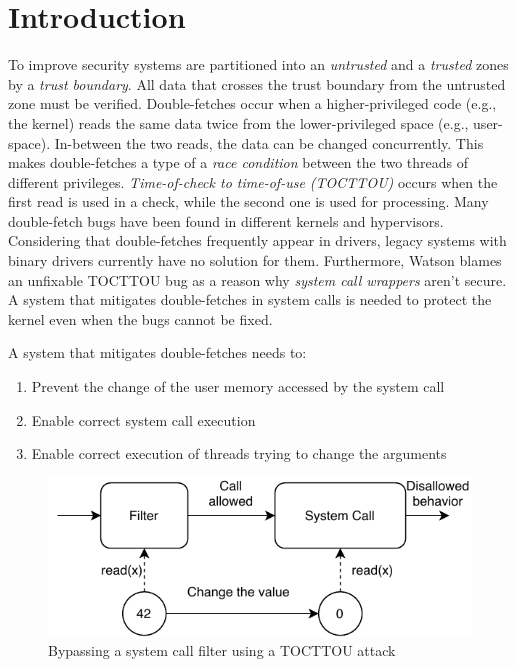 \section{Introduction}


To improve security systems are partitioned into an \emph{untrusted} and a
\emph{trusted} zones by a \emph{trust boundary}. All data that crosses the trust
boundary from the untrusted zone must be verified.
Double-fetches\cite{serna08doublefetch, twizsgrakky07ring0, wilhelm2016xenpwn,
wang2018survey} occur when a higher-privileged code (e.g., the kernel) reads the
same data twice from the lower-privileged space (e.g., user-space). In-between
the two reads, the data can be changed concurrently. This makes double-fetches a
type of a \emph{race condition} between the two threads of different privileges.
\emph{Time-of-check to time-of-use (TOCTTOU)} occurs when the first read is used
in a check, while the second one is used for processing. Many double-fetch bugs
have been found in different kernels and hypervisors\cite{cve201812633,
cve202012652, cve20131332, cve201920610, cve20158550, cve201610439,
cve201610435, cve201610433, cve20195519, cve20168438}. Considering that
double-fetches frequently appear in drivers, legacy systems with binary drivers
currently have no solution for them. Furthermore, Watson\cite{watson2007} blames
an unfixable TOCTTOU bug as a reason why \emph{system call wrappers} aren't
secure. A system that mitigates double-fetches in system calls is needed to
protect the kernel even when the bugs cannot be fixed.


A system that mitigates double-fetches needs to:
\begin{enumerate}
  \item Prevent the change of the user memory accessed by the system call
  \item Enable correct system call execution
  \item Enable correct execution of threads trying to change the arguments
\end{enumerate}


\begin{figure}[]
  \centering
  \includegraphics[width=.85\linewidth]{img/tocttou.pdf}
  \caption{Bypassing a system call filter using a TOCTTOU attack}
  \label{fig:tocttou}
\end{figure}

